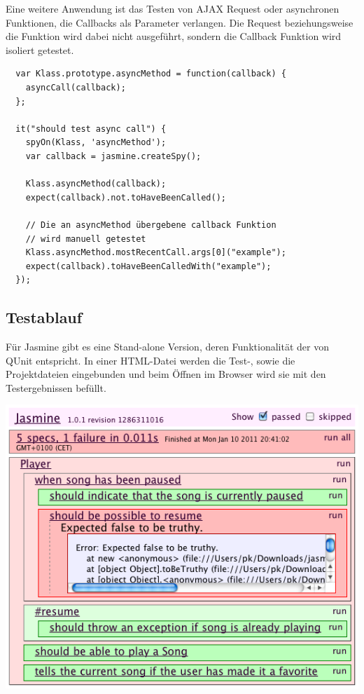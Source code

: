 \documentclass[11pt, a4paper]{article}
\begin{document}
Eine weitere Anwendung ist das Testen von AJAX Request oder asynchronen
Funktionen, die Callbacks als Parameter verlangen. Die Request beziehungsweise
die Funktion wird dabei nicht ausgeführt, sondern die Callback Funktion wird
isoliert getestet.

\begin{verbatim}
  var Klass.prototype.asyncMethod = function(callback) {
    asyncCall(callback);
  };

  it("should test async call") {
    spyOn(Klass, 'asyncMethod');
    var callback = jasmine.createSpy();

    Klass.asyncMethod(callback);
    expect(callback).not.toHaveBeenCalled();

    // Die an asyncMethod übergebene callback Funktion
    // wird manuell getestet
    Klass.asyncMethod.mostRecentCall.args[0]("example");
    expect(callback).toHaveBeenCalledWith("example");
  });
\end{verbatim}

\clearpage

\subsection{Testablauf}

Für Jasmine gibt es eine Stand-alone Version, deren Funktionalität der von QUnit
entspricht. In einer HTML-Datei werden die Test-, sowie die Projektdateien
eingebunden und beim Öffnen im Browser wird sie mit den Testergebnissen befüllt.

\begin{center}
  \includegraphics[width = 1\textwidth]{Jasmine.png}
\end{center}
\end{document}

